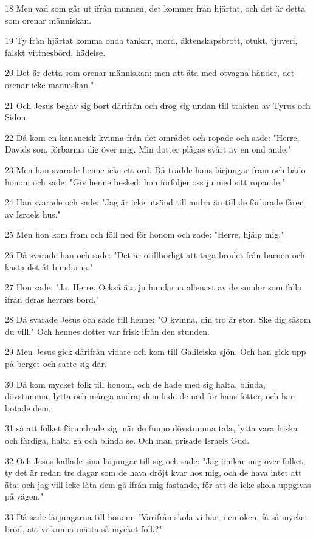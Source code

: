 \par 18 Men vad som går ut ifrån munnen, det kommer från hjärtat, och det är detta som orenar människan.
\par 19 Ty från hjärtat komma onda tankar, mord, äktenskapsbrott, otukt, tjuveri, falskt vittnesbörd, hädelse.
\par 20 Det är detta som orenar människan; men att äta med otvagna händer, det orenar icke människan."
\par 21 Och Jesus begav sig bort därifrån och drog sig undan till trakten av Tyrus och Sidon.
\par 22 Då kom en kananeisk kvinna från det området och ropade och sade: "Herre, Davids son, förbarma dig över mig. Min dotter plågas svårt av en ond ande."
\par 23 Men han svarade henne icke ett ord. Då trädde hans lärjungar fram och bådo honom och sade: "Giv henne besked; hon förföljer oss ju med sitt ropande."
\par 24 Han svarade och sade: "Jag är icke utsänd till andra än till de förlorade fåren av Israels hus."
\par 25 Men hon kom fram och föll ned för honom och sade: "Herre, hjälp mig."
\par 26 Då svarade han och sade: "Det är otillbörligt att taga brödet från barnen och kasta det åt hundarna."
\par 27 Hon sade: "Ja, Herre. Också äta ju hundarna allenast av de smulor som falla ifrån deras herrars bord."
\par 28 Då svarade Jesus och sade till henne: "O kvinna, din tro är stor. Ske dig såsom du vill." Och hennes dotter var frisk ifrån den stunden.
\par 29 Men Jesus gick därifrån vidare och kom till Galileiska sjön. Och han gick upp på berget och satte sig där.
\par 30 Då kom mycket folk till honom, och de hade med sig halta, blinda, dövstumma, lytta och många andra; dem lade de ned för hans fötter, och han botade dem,
\par 31 så att folket förundrade sig, när de funno dövstumma tala, lytta vara friska och färdiga, halta gå och blinda se. Och man prisade Israels Gud.
\par 32 Och Jesus kallade sina lärjungar till sig och sade: "Jag ömkar mig över folket, ty det är redan tre dagar som de hava dröjt kvar hos mig, och de hava intet att äta; och jag vill icke låta dem gå ifrån mig fastande, för att de icke skola uppgivas på vägen."
\par 33 Då sade lärjungarna till honom: "Varifrån skola vi här, i en öken, få så mycket bröd, att vi kunna mätta så mycket folk?"
